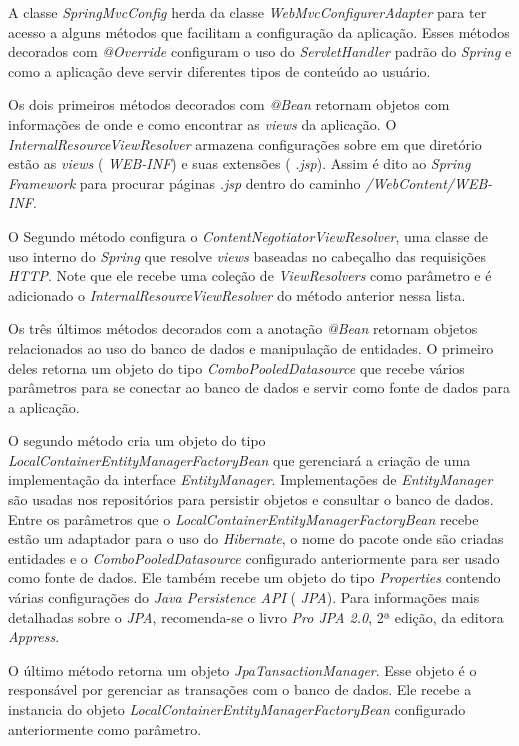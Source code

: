 \documentclass[a4paper,12pt]{article}
\newcommand{\est}[1] {
\textit{#1}}
\newcommand{\classe}[1] {
\textit{#1}}
\newcommand{\arquivo}[1] {
\textit{#1}}
\newcommand{\sigla}[1] {
\textit{#1}}
\newcommand{\annotation}[1] {
\textit{#1}}
\begin{document}
A classe \classe{SpringMvcConfig} herda da classe \classe{WebMvcConfigurerAdapter} para ter acesso a alguns métodos que facilitam a configuração da aplicação. Esses métodos decorados com \annotation{@Override} configuram o uso do \classe{ServletHandler} padrão do \est{Spring} e como a aplicação deve servir diferentes tipos de conteúdo ao usuário.

Os dois primeiros métodos decorados com \annotation{@Bean} retornam objetos com informações de onde e como encontrar as \est{views} da aplicação. O \classe{InternalResourceViewResolver} armazena configurações sobre em que diretório estão as \est{views} (\est{WEB-INF}) e suas extensões (\est{.jsp}). Assim é dito ao \est{Spring Framework} para procurar páginas \est{.jsp} dentro do caminho \arquivo{/WebContent/WEB-INF}.

O Segundo método configura o \classe{ContentNegotiatorViewResolver}, uma classe de uso interno do \est{Spring} que resolve \est{views} baseadas no cabeçalho das requisições \sigla{HTTP}. Note que ele recebe uma coleção de \classe{ViewResolvers} como parâmetro e é adicionado o \classe{InternalResourceViewResolver} do método anterior nessa lista.

Os três últimos métodos decorados com a anotação \annotation{@Bean} retornam objetos relacionados ao uso do banco de dados e manipulação de entidades. O primeiro deles retorna um objeto do tipo \classe{ComboPooledDatasource} que recebe vários parâmetros para se conectar ao banco de dados e servir como fonte de dados para a aplicação. 

O segundo método cria um objeto do tipo \classe{LocalContainerEntityManagerFactoryBean} que gerenciará a criação de uma implementação da interface \classe{EntityManager}. Implementações de \classe{EntityManager} são usadas nos repositórios para persistir objetos e consultar o banco de dados. Entre os parâmetros que o \classe{LocalContainerEntityManagerFactoryBean} recebe estão um adaptador para o uso do \est{Hibernate}, o nome do pacote onde são criadas entidades e o \classe{ComboPooledDatasource} configurado anteriormente para ser usado como fonte de dados. Ele também recebe um objeto do tipo \classe{Properties} contendo várias configurações do \est{Java Persistence API} (\sigla{JPA}). Para informações mais detalhadas sobre o \sigla{JPA}, recomenda-se o livro \est{Pro JPA 2.0}, 2ª edição, da editora \est{Appress}.

O último método retorna um objeto \classe{JpaTansactionManager}. Esse objeto é o responsável por gerenciar as transações com o banco de dados. Ele recebe a instancia do objeto \classe{LocalContainerEntityManagerFactoryBean} configurado anteriormente como parâmetro.
\end{document}
